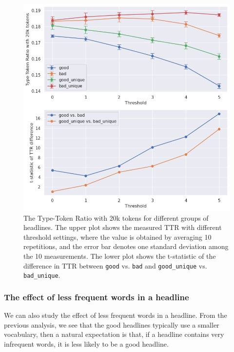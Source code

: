 \documentclass[%
preprint,
 amsmath,amssymb,
 aps,
]{revtex4-2}
\begin{document}
\begin{figure}
    \centering
    \includegraphics[width=0.8\linewidth]{fig/ttr3_error_plot.png}
    \caption{The Type-Token Ratio with 20k tokens for different groups of headlines. The upper plot shows the measured TTR with different threshold settings, where the value is obtained by averaging 10 repetitions, and the error bar denotes one standard deviation among the 10 measurements. The lower plot shows the t-statistic of the difference in TTR between \texttt{good} vs. \texttt{bad} and \texttt{good\_unique} vs. \texttt{bad\_unique}.}
    \label{fig:ttr3_error_plot}
\end{figure}

\subsubsection{The effect of less frequent words in a headline}

We can also study the effect of less frequent words in a headline.
From the previous analysis, we see that the good headlines typically use a smaller vocabulary, then a natural expectation is that, if a headline contains very infrequent words, it is less likely to be a good headline.
\end{document}
